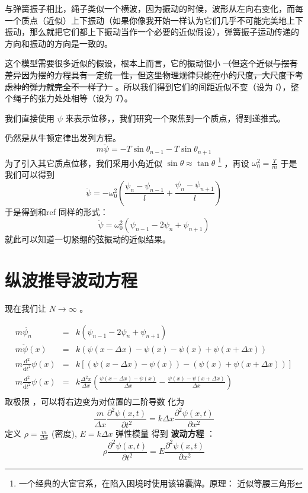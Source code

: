 \documentclass[11pt]{book}
\begin{document}
与弹簧振子相比，绳子类似一个横波，因为振动的时候，波形从左向右变化，而每一个质点（近似）上下振动（如果你像我开始一样认为它们几乎不可能完美地上下振动，那么就把它们都上下振动当作一个必要的近似假设），弹簧振子运动传递的方向和振动的方向是一致的。

这个模型需要很多近似的假设，根本上而言，它的振动很小
\sout{（但这个近似与摆有差异因为摆的方程具有一定统一性，但这里物理规律只能在小的尺度，大尺度下考虑神的弹力就完全不一样了）}
。所以我们得到它们的间距近似不变（设为 \(l\)），整个绳子的张力处处相等（设为 \(T\)）。

我们直接使用 \(\psi\) 来表示位移，，我们研究一个聚焦到一个质点，得到递推式。

仍然是从牛顿定律出发列方程。
\begin{equation}
\label{eq:36}
m\ddot{\psi}=-T\sin\theta_{n-1}-T\sin\theta_{n+1}
\end{equation}
为了引入其它质点位移，我们采用小角近似 \(\sin\theta\approx\tan\theta\)
\footnote{一个经典的大宦官系，在陷入困境时使用该锦囊牌。原理： 近似等腰三角形}
，再设 \(\omega_0^2=\frac{T}{m}\) 于是我们可以得到
\begin{equation}
\label{eq:37}
\ddot{\psi}=-\omega_0^2(\frac{\psi_n-\psi_{n-1}}{l}+\frac{\psi_n-\psi_{n+1}}{l})
\end{equation}
于是得到和ref 同样的形式：
\begin{equation}
\label{eq:38}
\ddot{\psi}=\omega_0^2(\psi_{n-1}-2\psi_n+\psi_{n+1})
\end{equation}
就此可以知道一切紧绷的弦振动的近似结果。
\section{纵波推导波动方程}
\label{sec:org8419d31}
现在我们让 \(N\rightarrow\infty\) 。

\begin{eqnarray}
\label{eq:11}
m\ddot{\psi_n} & = & k(\psi_{n-1}-2\psi_n+\psi_{n+1})\\
m\ddot{\psi}(x) & = & k(\psi(x-\Delta x)-\psi(x)-\psi(x)+\psi(x+\Delta x))\\
m \frac{\mathrm{d}^2}{\mathrm{d}t^2} \psi(x)&=&k[(\psi(x-\Delta x)-\psi(x))-(\psi(x)+\psi(x+\Delta x))]\\
m \frac{\mathrm{d}^2}{\mathrm{d}t^2} \psi(x)&=&k \frac{\Delta^{2} x}{\Delta x}(\frac{\psi(x-\Delta x)-\psi(x)}{\Delta x}-\frac{\psi(x)-\psi(x+\Delta x)}{\Delta x})\\
\end{eqnarray}
取极限
，可以将右边变为对位置的二阶导数
化为
\begin{equation}
\label{eq:9}
\frac{m}{\Delta x}\frac{\partial^2\psi(x,t)}{\partial t^2}=k\Delta x \frac{\partial^2 \psi(x,t)}{\partial x^2}
\end{equation}
定义 \(\rho=\frac{m}{\Delta x}\) (密度), \(E=k\Delta x\) 弹性模量
得到 \textbf{波动方程} ：
\begin{equation}
\label{eq:longWF}
\rho\frac{\partial^2\psi(x,t)}{\partial t^2}=E \frac{\partial^2 \psi(x,t)}{\partial x^2}
\end{equation}
\end{document}
